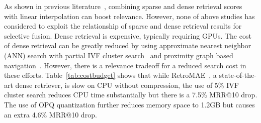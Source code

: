 
As shown in previous literature~\cite{Lin2021unicoil,2022LinearInterpolationJimLin, kuzi2020leveraging}, combining  sparse and dense retrieval scores with linear interpolation
can boost relevance. 
However, none of above studies has considered to exploit the relationship of sparse and dense retrieval results for selective fusion. 
Dense retrieval is expensive, typically requiring GPUs. 
The cost of dense retrieval can be greatly reduced  by using  approximate nearest neighbor (ANN) search with 
partial IVF cluster search~\cite{johnson2019billion, 2021Facebook-DrBoost-Lewis} and proximity graph based navigation~\cite{2020TPAMI-HNSW}.
However, there is a  relevance tradeoff for a  reduced search cost in these efforts.
Table~\ref{tab:costbudget} shows that  
while RetroMAE~\cite{Liu2022RetroMAE}, a state-of-the-art  dense retriever,  is slow on CPU without compression, the use of
5\% IVF cluster search reduces CPU time substantially  but there is a  7.5\% MRR@10 drop.
The use  of  OPQ quantization further reduces memory space  to 1.2GB but causes an extra 4.6\% MRR@10 drop.


